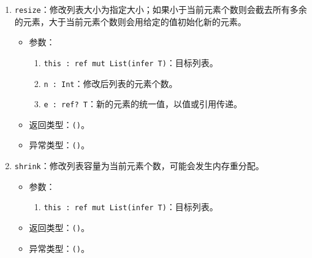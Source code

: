 \begin{enumerate}
	\item \lstinline!resize!：修改列表大小为指定大小；如果小于当前元素个数则会截去所有多余的元素，大于当前元素个数则会用给定的值初始化新的元素。
	\begin{itemize}
		\item 参数：
		\begin{enumerate}
			\item \lstinline!this : ref mut List(infer T)!：目标列表。
			\item \lstinline!n : Int!：修改后列表的元素个数。
			\item \lstinline!e : ref? T!：新的元素的统一值，以值或引用传递。
		\end{enumerate}
		\item 返回类型：\lstinline!()!。
		\item 异常类型：\lstinline!()!。
	\end{itemize}
	
	\item \lstinline!shrink!：修改列表容量为当前元素个数，可能会发生内存重分配。
	\begin{itemize}
		\item 参数：
		\begin{enumerate}
			\item \lstinline!this : ref mut List(infer T)!：目标列表。
		\end{enumerate}
		\item 返回类型：\lstinline!()!。
		\item 异常类型：\lstinline!()!。
	\end{itemize}
	
\end{enumerate}